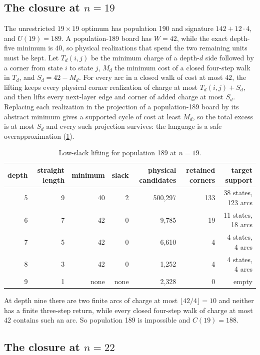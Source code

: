 \documentclass[10pt]{article}
\theoremstyle{remark}
\begin{document}
\subsection[The closure at n=19]{The closure at $n=19$}\label{app:n19}

The unrestricted $19\times19$ optimum has population 190 and signature
$142+12\cdot4$, and $U(19)=189$.  A population-189 board has $W=42$, while the
exact depth-five minimum is $40$, so physical realizations that spend the two
remaining units must be kept.  Let $T_d(i,j)$ be the minimum charge of a depth-$d$
side followed by a corner from state $i$ to state $j$, $M_d$ the minimum cost of
a closed four-step walk in $T_d$, and $S_d=42-M_d$.  For every arc in a closed
walk of cost at most $42$, the lifting keeps every physical corner realization of
charge at most $T_d(i,j)+S_d$, and then lifts every next-layer edge and corner of
added charge at most $S_d$.  Replacing each realization in the projection of a
population-189 board by its abstract minimum gives a supported cycle of cost at
least $M_d$, so the total excess is at most $S_d$ and every such projection
survives: the language is a safe overapproximation (\cref{tab:n19-lift}).

\begin{table}[h]
\centering
\caption{Low-slack lifting for population 189 at $n=19$.}
\label{tab:n19-lift}
\small
\begin{tabular}{@{}rrrrrrr@{}}
\toprule
depth & straight length & minimum & slack & physical candidates & retained corners & target support\\
\midrule
5 & 9 & 40 & 2 & 500,297 & 133 & 38 states, 123 arcs\\
6 & 7 & 42 & 0 & 9,785 & 19 & 11 states, 18 arcs\\
7 & 5 & 42 & 0 & 6,610 & 4 & 4 states, 4 arcs\\
8 & 3 & 42 & 0 & 1,252 & 4 & 4 states, 4 arcs\\
9 & 1 & none & none & 2,328 & 0 & empty\\
\bottomrule
\end{tabular}
\end{table}

At depth nine there are two finite arcs of charge at most $\lfloor42/4\rfloor=10$
and neither has a finite three-step return, while every closed four-step walk of
charge at most $42$ contains such an arc.  So population 189 is impossible and
$C(19)=188$.

\subsection[The closure at n=22]{The closure at $n=22$}\label{app:n22}
\end{document}
